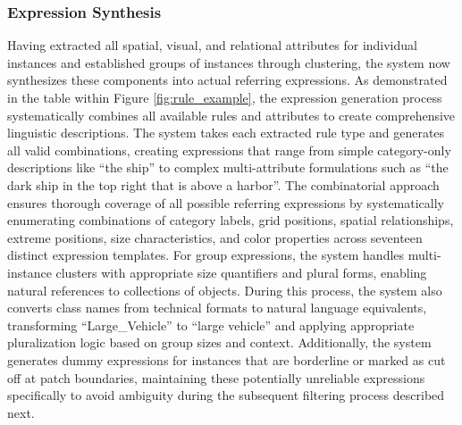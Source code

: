 \subsubsection{Expression Synthesis}
Having extracted all spatial, visual, and relational attributes for individual instances and established groups of instances through clustering, the system now synthesizes these components into actual referring expressions. As demonstrated in the table within Figure \ref{fig:rule_example}, the expression generation process systematically combines all available rules and attributes to create comprehensive linguistic descriptions. The system takes each extracted rule type and generates all valid combinations, creating expressions that range from simple category-only descriptions like ``the ship'' to complex multi-attribute formulations such as ``the dark ship in the top right that is above a harbor''. The combinatorial approach ensures thorough coverage of all possible referring expressions by systematically enumerating combinations of category labels, grid positions, spatial relationships, extreme positions, size characteristics, and color properties across seventeen distinct expression templates. For group expressions, the system handles multi-instance clusters with appropriate size quantifiers and plural forms, enabling natural references to collections of objects. During this process, the system also converts class names from technical formats to natural language equivalents, transforming ``Large\_Vehicle'' to ``large vehicle'' and applying appropriate pluralization logic based on group sizes and context. Additionally, the system generates dummy expressions for instances that are borderline or marked as cut off at patch boundaries, maintaining these potentially unreliable expressions specifically to avoid ambiguity during the subsequent filtering process described next.

